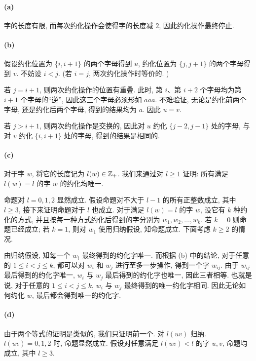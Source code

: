 \documentclass{article}
\begin{document}
\begin{solution}
	\paragraph{(a)} 字的长度有限, 而每次约化操作会使得字的长度减 $2$, 因此约化操作最终停止.

	\paragraph{(b)} 假设约化位置为 $\{i,i+1\}$ 的两个字母得到 $u$, 约化位置为 $\{j,j+1\}$ 的两个字母得到 $v$. 不妨设 $i<j$. (若 $i=j$, 两次约化操作时等价的. )

	若 $j = i+1$, 则两次约化操作的位置有重叠. 此时, 第 $i$、第 $i+2$ 个字母均为第 $i+1$ 个字母的``逆'', 因此这三个字母必须形如 $a \bar{a} a$. 不难验证, 无论是约化前两个字母, 还是约化后两个字母, 得到的结果均为 $a$. 因此 $u=v$.

	若 $j > i+1$, 则两次约化操作是交换的, 因此对 $u$ 约化 $\{j-2,j-1\}$ 处的字母, 与对 $v$ 约化 $\{i,i+1\}$ 处的字母, 得到的结果是相同的.

	\paragraph{(c)} 对于字 $w$, 将它的长度记为 $l(w) \in \mathbb{Z}_+$. 我们来通过对 $l\ge 1$ 证明: 所有满足 $l(w) = l$ 的字 $w$ 的约化均唯一. 

	命题对 $l = 0, 1, 2$ 显然成立. 假设命题对不大于 $l-1$ 的所有正整数成立, 其中 $l \ge 3$, 接下来证明命题对于 $l$ 也成立. 对于满足 $l(w) = l$ 的字 $w$, 设它有 $k$ 种约化的方式, 并且按每一种方式约化后得到的字分别为 $w_1, w_2, \dots, w_k$. 若 $k=0$ 则命题已经成立; 若 $k=1$, 则对 $w_1$ 使用归纳假设, 知命题成立. 下面考虑 $k\ge 2$ 的情况.

	由归纳假设, 知每一个 $w_i$ 最终得到的约化字唯一. 而根据 (b) 中的结论, 对于任意的 $1 \le i < j \le k$, 都可以对 $w_i$ 和 $w_j$ 进行至多一步操作, 得到一个字 $w_{ij}$. 由于 $w_{ij}$ 最后得到的约化字唯一, $w_i$ 与 $w_j$ 最后得到的约化字也唯一, 因此三者相等. 也就是说, 对于任意的 $1 \le i < j \le k$, $w_i$ 与 $w_j$ 最终得到的唯一约化字相同. 因此无论如何约化 $w$, 最后都会得到唯一的约化字. 

	\paragraph{(d)} 由于两个等式的证明是类似的, 我们只证明前一个. 对 $l(uv)$ 归纳. $l(uv) = 0, 1, 2$ 时, 命题显然成立. 假设对任意满足 $l(uv)< l$ 的字 $u,v$, 命题均成立, 其中 $l \ge 3$. 


\end{solution}
\end{document}
